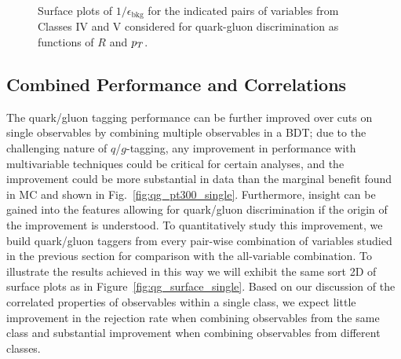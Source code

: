 %
\begin{figure}
\centering
{}
\caption{Surface plots of $1/\epsilon_\text{bkg}$ for the indicated pairs of variables from Classes IV and V considered for
  quark-gluon discrimination as functions of $R$ and $p_T$. }
\label{fig:qg_surface_pairA}
\end{figure}
%


\subsection{Combined Performance and Correlations}\label{sec:qg_combi}
The quark/gluon tagging performance can be further improved over cuts on single observables by 
combining multiple observables in a BDT; due to the challenging nature of $q$/$g$-tagging, any
improvement in performance with multivariable techniques could be critical for certain analyses, and the 
improvement could be more substantial in data than the marginal benefit found in MC  and shown
in Fig.~\ref{fig:qg_pt300_single}.
 Furthermore, insight can be gained into the 
features allowing for quark/gluon discrimination if the origin of the improvement  is
understood. To quantitatively study this improvement, we build quark/gluon taggers from
every pair-wise combination of variables studied in the previous section for comparison
with the all-variable combination.  To illustrate the results achieved in this way we will exhibit the same sort 2D of
surface plots as in Figure~\ref{fig:qg_surface_single}.  Based on our discussion of the correlated properties
of observables within a single class, we expect little improvement in the rejection rate when combining observables from the same class
and substantial improvement when combining observables from different classes.  

